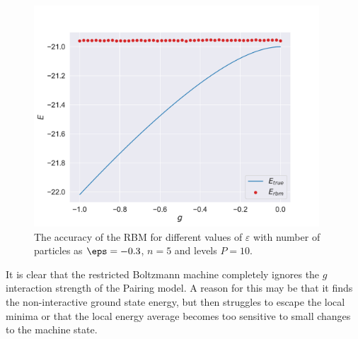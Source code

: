 \begin{figure}[H]
  \begin{center}
    \includegraphics[width=0.95\textwidth]{Figures/Plots/Pairing/val-true[g][-1.0-0.0][e=1000][n=10][n=5][eps=-0.3]}
  \end{center}
  \caption{The accuracy of the RBM for different values of $\varepsilon$ with number of particles as $\eps = -0.3$, $n=5$ and levels $P=10$.}
\end{figure}

It is clear that the restricted Boltzmann machine completely ignores the $g$ interaction strength of the Pairing model. A reason for this may be that it finds the non-interactive ground state energy, but then struggles to escape the local minima or that the local energy average becomes too sensitive to small changes to the machine state.

